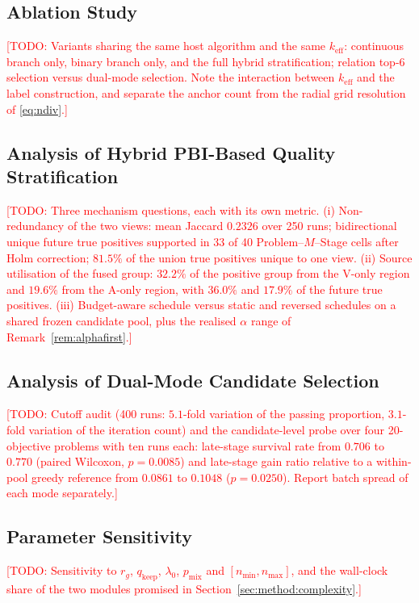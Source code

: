 \documentclass[11pt,a4paper]{article}
\newcommand{\keff}{k_{\mathrm{eff}}}
\newcommand{\TODO}[1]{\textcolor{red}{[TODO: #1]}}
\begin{document}
\subsection{Ablation Study}
\label{sec:exp:ablation}
\TODO{Variants sharing the same host algorithm and the same $\keff$: continuous
branch only, binary branch only, and the full hybrid stratification; relation
top-$6$ selection versus dual-mode selection. Note the interaction between
$\keff$ and the label construction, and separate the anchor count from the radial
grid resolution of \eqref{eq:ndiv}.}

\subsection{Analysis of Hybrid PBI-Based Quality Stratification}
\label{sec:exp:hpc}
\TODO{Three mechanism questions, each with its own metric. (i) Non-redundancy of
the two views: mean Jaccard $0.2326$ over 250 runs; bidirectional unique future
true positives supported in 33 of 40 Problem--$M$--Stage cells after Holm
correction; $81.5\%$ of the union true positives unique to one view.
(ii) Source utilisation of the fused group: $32.2\%$ of the positive group from
the V-only region and $19.6\%$ from the A-only region, with $36.0\%$ and
$17.9\%$ of the future true positives. (iii) Budget-aware schedule versus static
and reversed schedules on a shared frozen candidate pool, plus the realised
$\alpha$ range of Remark~\ref{rem:alphafirst}.}

\subsection{Analysis of Dual-Mode Candidate Selection}
\label{sec:exp:candidate}
\TODO{Cutoff audit (400 runs: $5.1$-fold variation of the passing proportion,
$3.1$-fold variation of the iteration count) and the candidate-level probe over
four 20-objective problems with ten runs each: late-stage survival rate from
$0.706$ to $0.770$ (paired Wilcoxon, $p=0.0085$) and late-stage gain ratio
relative to a within-pool greedy reference from $0.0861$ to $0.1048$
($p=0.0250$). Report batch spread of each mode separately.}

\subsection{Parameter Sensitivity}
\label{sec:exp:sensitivity}
\TODO{Sensitivity to $r_g$, $q_{\mathrm{keep}}$, $\lambda_0$, $p_{\mathrm{mix}}$
and $[n_{\min},n_{\max}]$, and the wall-clock share of the two modules promised
in Section~\ref{sec:method:complexity}.}
\end{document}
